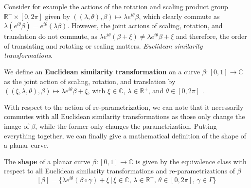 Consider for example the actions of the rotation and scaling product group
$\mathbb{R}^+ \times [0,2\pi]$ given by $((\lambda, \theta), \beta) \mapsto
\lambda e^{i\theta} \beta$, which clearly commute as $\lambda
(e^{i\theta}\beta) = e^{i\theta}(\lambda\beta)$.
However, the joint actions of scaling, rotation, and translation do not
commute, as $\lambda e^{i\theta}(\beta + \xi) \neq \lambda e^{i\theta}\beta +
\xi$ and therefore, the order of translating and rotating or scaling matters.
\textit{Euclidean similarity transformations}.
\begin{definition} 
  We define an \textbf{Euclidean similarity transformation} on a curve $\beta :
  [0,1] \rightarrow \mathbb{C}$ as the joint action of scaling, rotation, and
  translation by $((\xi, \lambda, \theta), \beta) \mapsto \lambda e^{i\theta}
  \beta + \xi$, with $\xi \in \mathbb{C}$, $\lambda \in \mathbb{R}^+$, and
  $\theta \in [0,2\pi]$ \parencite[see][62]{DrydenMardia2016}.
\end{definition}
With respect to the action of re-parametrization, we can note that it
necessarily commutes with all Euclidean similarity transformations as those
only change the image of $\beta$, while the former only changes the
parametrization.
Putting everything together, we can finally give a mathematical definition of
the shape of a planar curve.
\begin{definition}[Shape]
  The \textbf{shape} of a planar curve $\beta : [0,1] \rightarrow \mathbb{C}$
  is given by the equivalence class with respect to all Euclidean similarity
  transformations and re-parametrizations of $\beta$
  $$ [\beta] = \{\lambda e^{i\theta}(\beta \circ \gamma) + \xi\,|\, \xi \in
  \mathbb{C},\, \lambda \in \mathbb{R}^+,\, \theta \in [0,2\pi],\, \gamma \in
  \Gamma\} $$
\end{definition}





